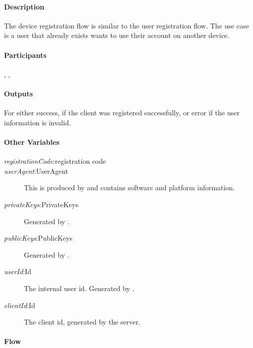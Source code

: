 \documentclass[a4paper,10pt]{article}
\newcommand{\registrationCode}{\emph{registrationCode}}
\newcommand{\userAgent}{\emph{userAgent}}
\newcommand{\privateKeys}{\emph{privateKeys}}
\newcommand{\publicKeys}{\emph{publicKeys}}
\newcommand{\userId}{\emph{userId}}
\newcommand{\clientId}{\emph{clientId}}
\begin{document}
\paragraph{Description}
The device registration flow is similar to the user registration flow. The use case is a user that already exists wants to use their account on another device.

\paragraph{Participants} \Server{}, \Client{}, \User{}

\paragraph{Outputs}
For \Client{} either success, if the client was registered successfully, or error if the user information is invalid.

\paragraph{Other Variables}
\SpecialItem
\begin{description}
 \item[\registrationCode{}:registration code]
 \item[\userAgent{}:UserAgent] This is produced by \Client{} and contains software and platform information.
 \item[\privateKeys{}:PrivateKeys] Generated by \Client{}.
 \item[\publicKeys{}:PublicKeys] Generated by \Client{}.
 \item[\userId{}:Id] The internal user id. Generated by \Server{}.
 \item[\clientId{}:Id] The client id, generated by the server.
\end{description}

\paragraph{Flow}
\end{document}
